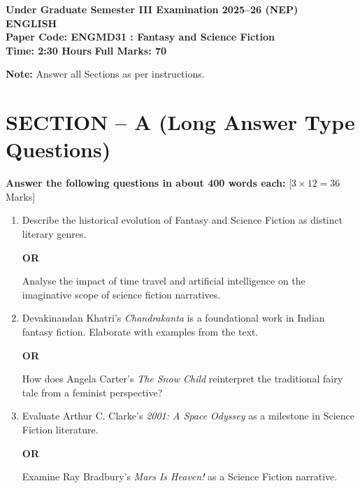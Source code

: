 \documentclass[11pt,a4paper]{article}
\begin{document}
\begin{center}
    {\Large   \textbf{Under Graduate Semester III Examination 2025--26 (NEP)}}\\[4pt]
    {\large   \textbf{ENGLISH}}\\[4pt]
   \textbf{Paper Code: ENGMD31 : Fantasy and Science Fiction}\\[6pt]
   \textbf{Time: 2:30 Hours} \hfill   \textbf{Full Marks: 70}
\end{center}
\hr




\noindent   \textbf{Note:} Answer all Sections as per instructions.

\section*{SECTION -- A (Long Answer Type Questions)}



\noindent   \textbf{Answer the following questions in about 400 words each:} \hfill [$3  \times 12 = 36$ Marks]


\begin{enumerate}[label=   \textbf{\arabic*.}]
    \item Describe the historical evolution of Fantasy and Science Fiction as distinct literary genres.
    
\begin{center}   \textbf{OR}\end{center}
    Analyse the impact of time travel and artificial intelligence on the imaginative scope of science fiction narratives.

    \item Devakinandan Khatri's   \textit{Chandrakanta} is a foundational work in Indian fantasy fiction. Elaborate with examples from the text.
    
\begin{center}   \textbf{OR}\end{center}
    How does Angela Carter's   \textit{The Snow Child} reinterpret the traditional fairy tale from a feminist perspective?

    \item Evaluate Arthur C. Clarke's   \textit{2001: A Space Odyssey} as a milestone in Science Fiction literature.
    
\begin{center}   \textbf{OR}\end{center}
    Examine Ray Bradbury's   \textit{Mars Is Heaven!} as a Science Fiction narrative.
\end{enumerate}
\end{document}
